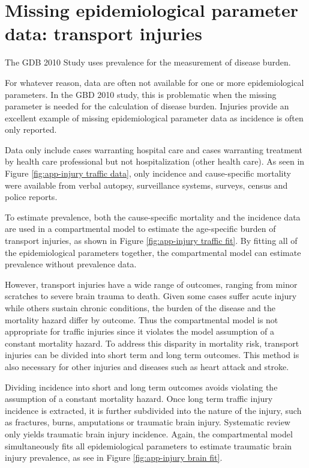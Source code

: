 \chapter{Missing epidemiological parameter data: transport injuries}
\label{applications-double_dismod}

The GDB 2010 Study uses prevalence for the measurement of disease burden.



For whatever reason, data are often not available for one or more
epidemiological parameters.  In the GBD 2010 study, this is
problematic when the missing parameter is needed for the calculation
of disease burden.  Injuries provide an excellent example of missing
epidemiological parameter data as incidence is often only reported.

Data only include cases warranting hospital care and cases warranting
treatment by health care professional but not hospitalization (other
health care).  As seen in Figure \ref{fig:app-injury traffic data},
only incidence and cause-specific mortality were available from verbal
autopsy, surveillance systems, surveys, census and police reports.

To estimate prevalence, both the cause-specific mortality and the
incidence data are used in a compartmental model to estimate the
age-specific burden of transport injuries, as shown in Figure
\ref{fig:app-injury traffic fit}.  By fitting all of the epidemiological
parameters together, the compartmental model can estimate prevalence
without prevalence data.

However, transport injuries have a wide range of
outcomes, ranging from minor scratches to severe brain trauma to
death.  Given some cases suffer acute injury while others sustain
chronic conditions, the burden of the disease and the mortality hazard
differ by outcome.  Thus the compartmental model is not appropriate
for traffic injuries since it violates the model assumption of a
constant mortality hazard.  To address this disparity in mortality
risk, transport injuries can be divided into short term and long term
outcomes.  This method is also necessary for other injuries and
diseases such as heart attack and stroke.

Dividing incidence into short and long term outcomes avoids violating
the assumption of a constant mortality hazard.  Once long term traffic
injury incidence is extracted, it is further subdivided into the
nature of the injury, such as fractures, burns, amputations or
traumatic brain injury.  Systematic review only yields traumatic brain
injury incidence.  Again, the compartmental model simultaneously fits
all epidemiological parameters to estimate traumatic brain injury
prevalence, as see in Figure \ref{fig:app-injury brain fit}.


